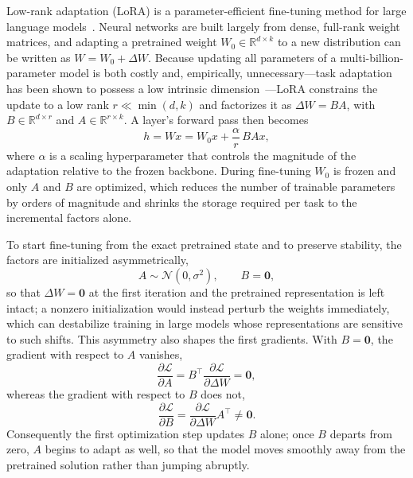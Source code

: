 \documentclass[english,12pt,a4paper,pdftex,elec,utf8]{aaltothesis}
\begin{document}
Low-rank adaptation (LoRA) is a parameter-efficient fine-tuning method for large language models~\cite{hu2021loralowrankadaptationlarge}. Neural networks are built largely from dense, full-rank weight matrices, and adapting a pretrained weight $W_0 \in \mathbb{R}^{d\times k}$ to a new distribution can be written as $W = W_0 + \Delta W$. Because updating all parameters of a multi-billion-parameter
model is both costly and, empirically, unnecessary---task adaptation has been shown to possess a low intrinsic dimension~\cite{aghajanyan2020intrinsicdimensionalityexplainseffectiveness}---LoRA constrains the update to a low rank $r \ll \min(d,k)$ and factorizes it as $\Delta W = BA$, with $B \in \mathbb{R}^{d\times r}$ and $A \in \mathbb{R}^{r\times k}$. A layer's forward pass then becomes
\begin{equation}
h = Wx = W_0 x + \frac{\alpha}{r}\, B A x,
\label{eq:lora-forward}
\end{equation}
where $\alpha$ is a scaling hyperparameter that controls the magnitude of the adaptation relative to the frozen backbone. During fine-tuning $W_0$ is frozen and only $A$ and $B$ are optimized, which reduces the number of trainable parameters by orders of magnitude and shrinks the storage required per task to the incremental factors alone.

To start fine-tuning from the exact pretrained state and to preserve stability, the factors are initialized asymmetrically,
\begin{equation}
A \sim \mathcal{N}(0, \sigma^2), \qquad B = \mathbf{0},
\label{eq:lora-init}
\end{equation}
so that $\Delta W = \mathbf{0}$ at the first iteration and the pretrained representation is left intact; a nonzero initialization would instead perturb the weights immediately, which can destabilize training in large models whose representations are sensitive to such shifts. This asymmetry also shapes the first
gradients. With $B = \mathbf{0}$, the gradient with respect to $A$ vanishes,
\begin{equation}
\frac{\partial \mathcal{L}}{\partial A}
= B^{\top} \frac{\partial \mathcal{L}}{\partial \Delta W} = \mathbf{0},
\end{equation}
whereas the gradient with respect to $B$ does not,
\begin{equation}
\frac{\partial \mathcal{L}}{\partial B}
= \frac{\partial \mathcal{L}}{\partial \Delta W} A^{\top} \neq \mathbf{0}.
\end{equation}
Consequently the first optimization step updates $B$ alone; once $B$ departs from zero, $A$ begins to adapt as well, so that the model moves smoothly away from the pretrained solution rather than jumping abruptly.
\end{document}
